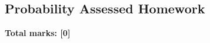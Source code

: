 \documentclass[../s1]{subfiles}
\begin{document}
\subsection*{Probability Assessed Homework}
\thispagestyle{fancy}



\begin{flushright}
\textbf{Total marks: [0]}
\end{flushright}
\end{document}

